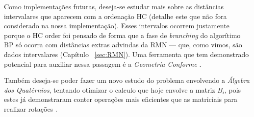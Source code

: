 \documentclass[a4paper,12pt]{article}
\begin{document}
	Como implementações futuras, deseja-se estudar mais sobre as distâncias intervalares que aparecem com a ordenação HC \cite{carlile:MinimalOrder} (detalhe este que não fora considerado na nossa implementação). Esses intervalos ocorrem justamente porque o HC order foi pensado de forma que a fase de \textit{branching} do algorítimo BP só ocorra com distâncias extras advindas da RMN \cite{carlile:MinimalOrder} --- que, como vimos, são dados intervalares (Capítulo ~\ref{sec:RMN}). Uma ferramenta que tem demonstrado potencial para auxiliar nessa passagem é a \textit{Geometria Conforme} \cite{carlileBook31Coloquio}.
	
	Também deseja-se poder fazer um novo estudo do problema envolvendo a \textit{Álgebra dos Quatérnios}, tentando otimizar o calculo que hoje envolve a matriz $B_i$, pois estes já demonstraram conter operações mais eficientes que as matriciais para realizar rotações \cite{fidalgotese}.
	
	\newpage
	
	
	
	
	\newpage
	\appendix
	
\end{document}
